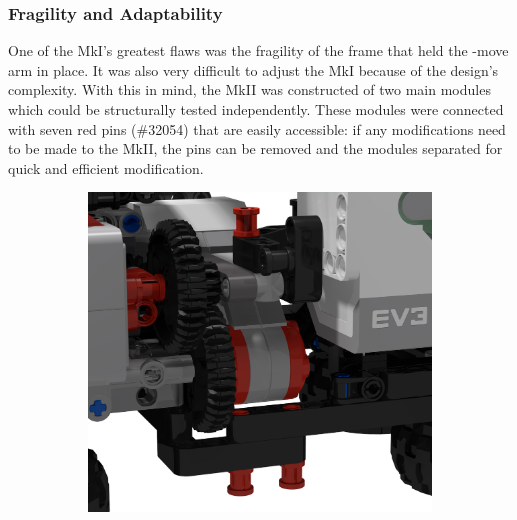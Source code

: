 \documentclass{report}
\newcommand{\legopiece}[1]{(\##1)}
\newcommand{\move}[1]{\uppercase{\texttt{\formatmovesnospace{#1}}}-move}
\begin{document}
	\subsubsection{Fragility and Adaptability}
	
	One of the MkI's greatest flaws was the fragility of the frame that held the \move{x} arm in place. It was also very difficult to adjust the MkI because of the design's complexity. With this in mind, the MkII was constructed of two main modules which could be structurally tested independently. These modules were connected with seven red pins \legopiece{32054} that are easily accessible: if any modifications need to be made to the MkII, the pins can be removed and the modules separated for quick and efficient modification.
	
	\begin{figure}[H]
		\centering
		\begin{subfigure}[b]{0.25\textwidth}
			\includegraphics[width=\textwidth]{Resources/Images/rdrModulePins1.png}
			\label{fig:rdrModulePins1}
		\end{subfigure}
		\hspace{10mm}
		\begin{subfigure}[b]{0.25\textwidth}

\end{subfigure}
\end{figure}
\end{document}
